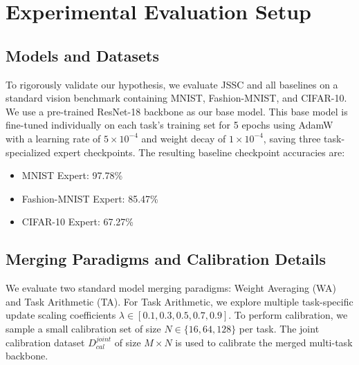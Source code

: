 \documentclass{article}
\begin{document}
\section{Experimental Evaluation Setup}
\label{sec:experiments}

\subsection{Models and Datasets}
To rigorously validate our hypothesis, we evaluate JSSC and all baselines on a standard vision benchmark containing MNIST, Fashion-MNIST, and CIFAR-10. We use a pre-trained ResNet-18 backbone as our base model. This base model is fine-tuned individually on each task's training set for 5 epochs using AdamW with a learning rate of $5 \times 10^{-4}$ and weight decay of $1 \times 10^{-4}$, saving three task-specialized expert checkpoints.
The resulting baseline checkpoint accuracies are:
\begin{itemize}
    \item MNIST Expert: 97.78\%
    \item Fashion-MNIST Expert: 85.47\%
    \item CIFAR-10 Expert: 67.27\%
\end{itemize}

\subsection{Merging Paradigms and Calibration Details}
We evaluate two standard model merging paradigms: Weight Averaging (WA) and Task Arithmetic (TA). For Task Arithmetic, we explore multiple task-specific update scaling coefficients $\lambda \in [0.1, 0.3, 0.5, 0.7, 0.9]$. To perform calibration, we sample a small calibration set of size $N \in \{16, 64, 128\}$ per task. The joint calibration dataset $D_{cal}^{joint}$ of size $M \times N$ is used to calibrate the merged multi-task backbone.
\end{document}

